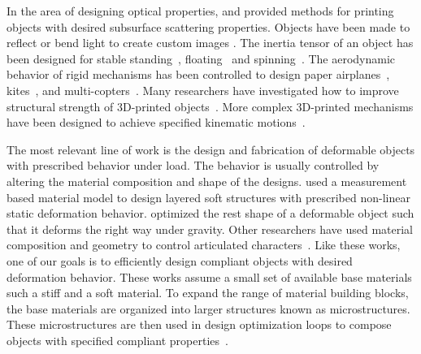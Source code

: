In the area of designing optical properties, \citet{Hasan:2010:PRO} and
\citet{Dong:2010:FSS} provided methods for printing objects with desired subsurface scattering properties. Objects have been made to reflect or bend light to create custom images \citep{papas11goal,Weyrich:2009,kiser2013}.
The inertia tensor of an object has been designed for stable standing~\citep{Prevost:2013kb}, floating~\citep{musialski-2015}
and spinning~\citep{Bacher:2014}.
The aerodynamic behavior of rigid mechanisms has been controlled to design paper airplanes~\citep{Umetani:2014}, kites~\citep{Martin:2015}, and multi-copters~\citep{Du:2016}.
Many researchers have investigated how to improve structural strength of 3D-printed objects~\citep{Stava:2012,Zhou:2013,Langlois:2016,Wu:2016,Ulu:2017}.
More complex 3D-printed mechanisms have been designed to achieve specified kinematic motions~\citep{Zhu:2012,Coros:2013:CDM,Bacher:2015,Megaro:2017}.

The most relevant line of work is the design and fabrication of deformable objects with prescribed behavior under load.
The behavior is usually controlled by altering the material
composition and shape of the designs.
\citet{Bickel:2010:DAF} used a measurement based material model to design 
layered soft structures with prescribed non-linear static deformation behavior.
\citet{Chen:2014:ANM} optimized the rest shape of a deformable object such that 
it deforms the right way under gravity.
Other researchers have used material composition and geometry to control 
articulated characters~\citep{Bickel:2012,Skouras13Computational}.
Like these works, one of our goals is to efficiently design compliant objects 
with desired deformation behavior.
These works assume a small set of available 
base materials such a stiff and a soft material.
To expand the range of material building blocks, the base materials are 
organized into larger structures known as microstructures.
These microstructures are then used in design optimization loops to 
compose objects with specified compliant 
properties~\citep{Schumacher:2015,Panetta:2015,Zhu:2017:TTO}.

